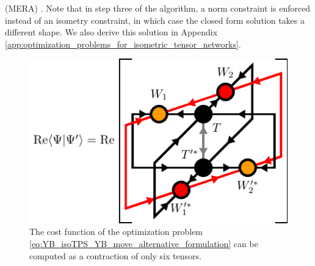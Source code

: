 (MERA) \cite{cite:algorithms_for_entanglement_renormalization, cite:algorithms_for_entanglement_renormalization_boundaries_impurities_interfaces}. Note that in step three of the algorithm, a norm constraint is enforced instead of an isometry constraint, in which case the closed form solution takes a different shape. We also derive this solution in Appendix \ref{app:optimization_problems_for_isometric_tensor_networks}.\par
\begin{figure}
	\centering
	\includegraphics[scale=1]{figures/tikz/YB_isoTPS/yang_baxter_move_iterative/yang_baxter_move_iterative_a.pdf}
	\caption{The cost function of the optimization problem \eqref{eq:YB_isoTPS_YB_move_alternative_formulation} can be computed as a contraction of only six tensors.}
	\label{fig:YB_move_iterate_polar_overlap}
\end{figure}
